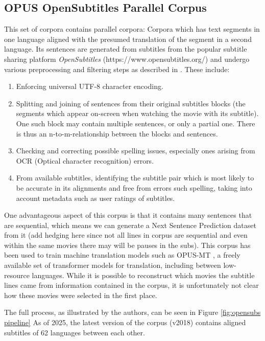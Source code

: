\subsection{OPUS OpenSubtitles Parallel Corpus}
This set of corpora contains parallel corpora:
Corpora which has text segments in one language aligned with the presumed translation of the segment in a second language.
Its sentences are generated from subtitles from the popular subtitle sharing platform \textit{OpenSubtitles} (https://www.opensubtitles.org/) and undergo various preprocessing and filtering steps as described in \cite{lisonOpensubtitles2016ExtractingLarge2016}.
These include:
\begin{enumerate}
	\item Enforcing universal UTF-8 character encoding.
	\item
	      Splitting and joining of sentences from their original subtitles blocks (the segments which appear on-screen when watching the movie with its subtitle).
	      One such block may contain multiple sentences, or only a partial one.
	      There is thus an n-to-m-relationship between the blocks and sentences.
	\item Checking and correcting possible spelling issues, especially ones arising from OCR (Optical character recognition) errors.
	\item From available subtitles, identifying the subtitle pair which is most likely to be accurate in its alignments and free from errors such spelling, taking into account metadata such as user ratings of subtitles.

\end{enumerate}
One advantageous aspect of this corpus is that it contains many sentences that are sequential, which means we can generate a Next Sentence Prediction dataset from it (add hedging here since not all lines in corpus are sequential and even within the same movies there may will be pauses in the subs).
This corpus has been used to train machine translation models such as OPUS-MT \cite{tiedemannOPUSMTbuildingOpenTranslation2020}, a freely available set of transformer models for translation, including between low-resource languages. 
While it is possible to reconstruct which movies the subtitle lines came from information contained in the corpus, it is unfortunately not clear how these movies were selected in the first place.

The full process, as illustrated by the authors, can be seen in Figure \ref{fig:opensubs pipeline}
As of 2025, the latest version of the corpus (v2018) contains aligned subtitles of 62 languages between each other.

